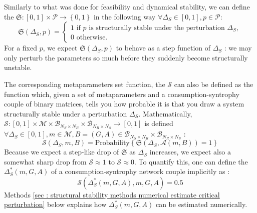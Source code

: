 \documentclass[12pt, titlepage]{report}
\begin{document}
Similarly to what was done for feasibility and dynamical stability, we can define the  $\mathfrak{S} : [0,1] \times \mathcal{P} \rightarrow \left\{0,1\right\}$ in the following way $\forall \Delta_S \in [0,1], p \in \mathcal{P}$:
\begin{equation}
\mathfrak{S}(\Delta_S, p)=
\begin{cases}
1 \text{ if }p \text{ is structurally stable under the perturbation }\Delta_S, \\
0 \text{ otherwise.}
\end{cases}
\end{equation}
For a fixed $p$, we expect $\mathfrak{S}(\Delta_S, p)$ to behave as a step function of $\Delta_S$ : we may only perturb the parameters so much before they suddenly become structurally unstable.

The corresponding metaparameters set function, the  $\mathcal{S}$
can also be defined as the function which, given a set of metaparameters and a consumption-syntrophy couple of binary matrices, tells you how probable it is that you draw a system structurally stable under a perturbation $\Delta_S$. Mathematically, $\mathcal{S} : [0,1] \times \mathcal{M} \times \mathcal{B}_{N_S \times N_R} \times \mathcal{B}_{N_R \times N_S} \rightarrow [0,1]$ is defined $\forall \Delta_S \in [0,1], m \in \mathcal{M}, B=(G,A) \in \mathcal{B}_{N_S \times N_R} \times \mathcal{B}_{N_R \times N_S}$ :
\begin{equation}
\boxed{
\mathcal{S}(\Delta_S, m, B)= \text{Probability}\left\{\mathfrak{S}(\Delta_S, \mathcal{A}(m, B))=1\right\}
}
\end{equation}
Because we expect a step-like drop of $\mathfrak{S}$ as $\Delta_S$ increases, we expect also a somewhat sharp drop from $\mathcal{S} \approx 1$ to $\mathcal{S} \approx 0$. To quantify this, one can define the  $\Delta_S^*(m,G,A)$ of a consumption-syntrophy network couple implicitly as :
\begin{equation}
\mathcal{S}(\Delta_S^*(m, G, A), m, G,A)=0.5
\end{equation}
Methods \ref{sec : structural stability methods numerical estimate critical perturbation} below explains how $\Delta_S^*(m, G,A)$ can be estimated numerically.

\end{document}
